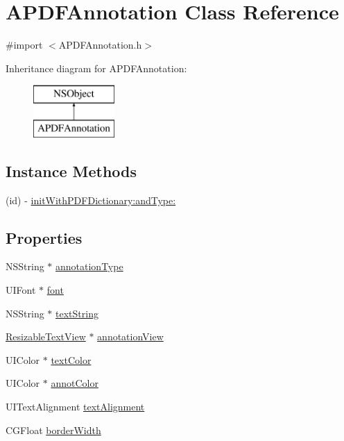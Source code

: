 \hypertarget{interface_a_p_d_f_annotation}{\section{A\-P\-D\-F\-Annotation Class Reference}
\label{interface_a_p_d_f_annotation}
}


{\ttfamily \#import $<$A\-P\-D\-F\-Annotation.\-h$>$}

Inheritance diagram for A\-P\-D\-F\-Annotation\-:\begin{figure}[H]
\begin{center}
\leavevmode
\includegraphics[height=2.000000cm]{interface_a_p_d_f_annotation}
\end{center}
\end{figure}
\subsection*{Instance Methods}
\begin{DoxyCompactItemize}
\item 
(id) -\/ \hyperlink{interface_a_p_d_f_annotation_a52ff93c3cda40c8d0a4b3c49b1bf646f}{init\-With\-P\-D\-F\-Dictionary\-:and\-Type\-:}
\end{DoxyCompactItemize}
\subsection*{Properties}
\begin{DoxyCompactItemize}
\item 
N\-S\-String $\ast$ \hyperlink{interface_a_p_d_f_annotation_a0151ed813f0043344ffc890de7f3d000}{annotation\-Type}
\item 
U\-I\-Font $\ast$ \hyperlink{interface_a_p_d_f_annotation_a9c2cdd317cf382753204627ee4fed4fb}{font}
\item 
N\-S\-String $\ast$ \hyperlink{interface_a_p_d_f_annotation_ac7a9328cd7302940ddfbe3cbe79cb7ee}{text\-String}
\item 
\hyperlink{interface_resizable_text_view}{Resizable\-Text\-View} $\ast$ \hyperlink{interface_a_p_d_f_annotation_aa2b404a57629cd6728d4a59d3e762fb7}{annotation\-View}
\item 
U\-I\-Color $\ast$ \hyperlink{interface_a_p_d_f_annotation_a2d67df8bfd2b3d4182ee5a88a6e916ff}{text\-Color}
\item 
U\-I\-Color $\ast$ \hyperlink{interface_a_p_d_f_annotation_a9cab5deed33c003423446b122356a8f6}{annot\-Color}
\item 
U\-I\-Text\-Alignment \hyperlink{interface_a_p_d_f_annotation_afaac76ef1a7c19ee46e05315828f3283}{text\-Alignment}
\item 
C\-G\-Float \hyperlink{interface_a_p_d_f_annotation_a835dbd5060e5a2c982ed3da97d2a90de}{border\-Width}
\end{DoxyCompactItemize}


